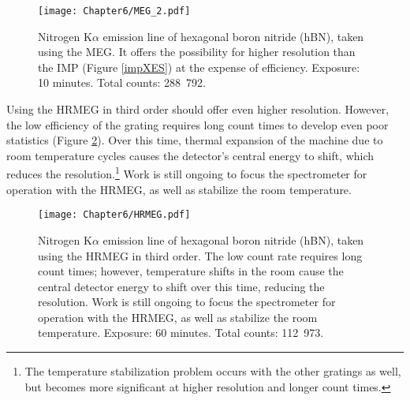 \begin{figure}[htbp] %
   \centering
   \texttt{[image: Chapter6/MEG\_2.pdf]} 
   \caption[Nitrogen K$\alpha$ emission line of hexagonal boron nitride (hBN), taken using the MEG.]{Nitrogen K$\alpha$ emission line of hexagonal boron nitride (hBN), taken using the MEG.  It offers the possibility for higher resolution than the IMP (Figure \ref{impXES}) at the expense of efficiency.  Exposure: 10 minutes.  Total counts: 288~792.}
   \label{megXES}
\end{figure}

Using the HRMEG in third order should offer even higher resolution.  However, the low efficiency of the grating requires long count times to develop even poor statistics (Figure \ref{hrmegXES}).  Over this time, thermal expansion of the machine due to room temperature cycles causes the detector's central energy to shift, which reduces the resolution.\footnote{The temperature stabilization problem occurs with the other gratings as well, but becomes more significant at higher resolution and longer count times.} Work is still ongoing to focus the spectrometer for operation with the HRMEG, as well as stabilize the room temperature.

\begin{figure}[htbp] %
   \centering
   \texttt{[image: Chapter6/HRMEG.pdf]} 
   \caption[Nitrogen K$\alpha$ emission line of hexagonal boron nitride (hBN), taken using the HRMEG in third order.]{Nitrogen K$\alpha$ emission line of hexagonal boron nitride (hBN), taken using the HRMEG in third order.  The low count rate requires long count times; however, temperature shifts in the room cause the central detector energy to shift over this time, reducing the resolution.  Work is still ongoing to focus the spectrometer for operation with the HRMEG, as well as stabilize the room temperature.    Exposure: 60 minutes.  Total counts: 112~973.}
   \label{hrmegXES}
\end{figure}


